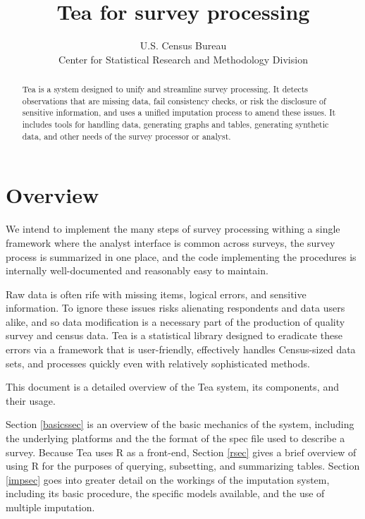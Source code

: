 \documentclass{article}
\begin{document}
\author{U.S. Census Bureau\\Center for Statistical Research and Methodology Division}
\title{Tea for survey processing}
\maketitle

\begin{abstract}
Tea is a system designed to unify and streamline survey processing.  It detects
observations that are missing data, fail consistency checks, or risk the disclosure
of sensitive information, and uses a unified imputation process to amend these issues.
It includes tools for handling data, generating graphs and tables, generating synthetic
data, and other needs of the survey processor or analyst.
\end{abstract}


\section{Overview}
{\sc We intend} to implement the many steps of survey processing withing a single
framework where the analyst interface is common across surveys, the survey process
is summarized in one place, and the code implementing the procedures is internally
well-documented and reasonably easy to maintain.

Raw data is often rife with missing items, logical errors, and sensitive information.
To ignore these issues risks alienating respondents and data users alike, and so data
modification is a necessary part of the production of quality survey and census data.
Tea is a statistical library designed to eradicate these errors via a framework
that is user-friendly, effectively handles Census-sized data sets, and processes
quickly even with relatively sophisticated methods.

This document is a detailed overview of the Tea system, its components, and their usage.

Section \ref{basicssec} is an overview of the basic mechanics of the system, including the
underlying platforms and the the format of the spec file used to describe a survey.
Because Tea uses R as a front-end, Section \ref{rsec} gives a brief overview of using R
for the purposes of querying, subsetting, and summarizing tables.
Section \ref{impsec} goes into greater detail on the workings of the imputation system,
including its basic procedure, the specific models available, and the use of multiple imputation.
\end{document}
